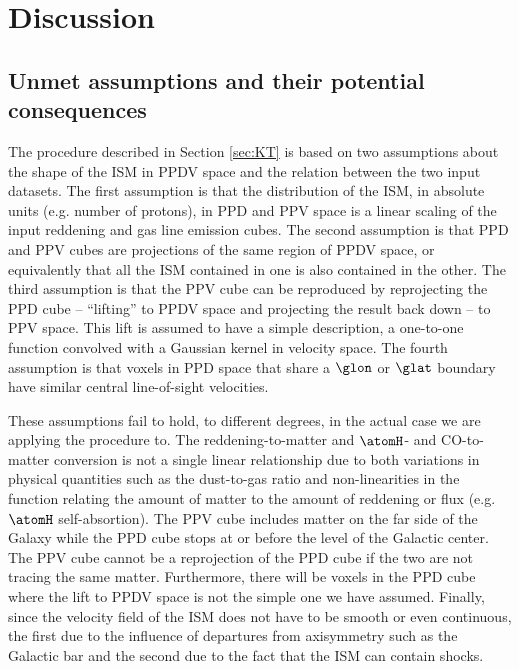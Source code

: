 \section{Discussion}
\label{sec:discussion}

\subsection{Unmet assumptions and their potential consequences}
\label{sec:discussion-systematics}

The procedure described in Section \ref{sec:KT} is based on two assumptions about the shape of the ISM in PPDV space and the relation between the two input datasets.
The first assumption is that the distribution of the ISM, in absolute units (e.g. number of protons), in PPD and PPV space is a linear scaling of the input reddening and gas line emission cubes.
The second assumption is that PPD and PPV cubes are projections of the same region of PPDV space, or equivalently that all the ISM contained in one is also contained in the other.
The third assumption is that the PPV cube can be reproduced by reprojecting the PPD cube -- ``lifting'' to PPDV space and projecting the result back down -- to PPV space.
This lift is assumed to have a simple description, a one-to-one function convolved with a Gaussian kernel in velocity space.
The fourth assumption is that voxels in PPD space that share a $\glon$ or $\glat$ boundary have similar central line-of-sight velocities.

These assumptions fail to hold, to different degrees, in the actual case we are applying the procedure to. 
The reddening-to-matter and $\atomH$- and CO-to-matter conversion is not a single linear relationship due to both variations in physical quantities such as the dust-to-gas ratio and non-linearities in the function relating the amount of matter to the amount of reddening or flux (e.g. $\atomH$ self-absortion). 
The PPV cube includes matter on the far side of the Galaxy while the PPD cube stops at or before the level of the Galactic center.
The PPV cube cannot be a reprojection of the PPD cube if the two are not tracing the same matter. 
Furthermore, there will be voxels in the PPD cube where the lift to PPDV space is not the simple one we have assumed.
Finally, since the velocity field of the ISM does not have to be smooth or even continuous, the first due to the influence of departures from axisymmetry such as the Galactic bar and the second due to the fact that the ISM can contain shocks.

